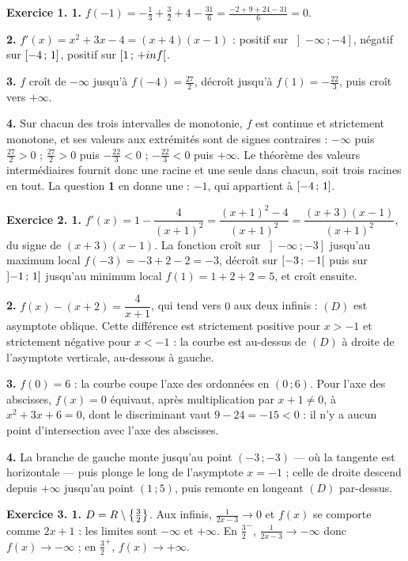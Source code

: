 \begin{corrige}
\textbf{Exercice 1. 1.} $f(-1) = -\frac13+\frac32+4-\frac{31}{6}
= \frac{-2+9+24-31}{6} = 0$.

\textbf{2.} $f'(x) = x^{2}+3x-4 = (x+4)(x-1)$ : positif sur
$\left]-\infty\,;-4\right]$, négatif sur $\left[-4\,;\,1\right]$, positif sur
$\left[1\,;\,+inf\right[$.

\textbf{3.} $f$ croît de $-\infty$ jusqu'à $f(-4) = \frac{27}{2}$, décroît
jusqu'à $f(1) = -\frac{22}{3}$, puis croît vers $+\infty$.

\textbf{4.} Sur chacun des trois intervalles de monotonie, $f$ est continue
et strictement monotone, et ses valeurs aux extrémités sont de signes
contraires : $-\infty$ puis $\frac{27}{2}>0$ ; $\frac{27}{2}>0$ puis
$-\frac{22}{3}<0$ ; $-\frac{22}{3}<0$ puis $+\infty$. Le théorème des valeurs
intermédiaires fournit donc une racine et une seule dans chacun, soit trois
racines en tout. La question \textbf{1} en donne une : $-1$, qui appartient à
$\left[-4\,;\,1\right]$.

\medskip
\textbf{Exercice 2. 1.} $f'(x) = 1-\dfrac{4}{(x+1)^{2}}
= \dfrac{(x+1)^{2}-4}{(x+1)^{2}} = \dfrac{(x+3)(x-1)}{(x+1)^{2}}$, du signe de
$(x+3)(x-1)$. La fonction croît sur $\left]-\infty\,;-3\right]$ jusqu'au
maximum local $f(-3) = -3+2-2 = -3$, décroît sur $\left[-3\,;\,-1\right[$ puis
sur $\left]-1\,;\,1\right]$ jusqu'au minimum local $f(1) = 1+2+2 = 5$, et croît
ensuite.

\textbf{2.} $f(x)-(x+2) = \dfrac{4}{x+1}$, qui tend vers $0$ aux deux
infinis : $(D)$ est asymptote oblique. Cette différence est strictement
positive pour $x>-1$ et strictement négative pour $x<-1$ : la courbe est
au-dessus de $(D)$ à droite de l'asymptote verticale, au-dessous à gauche.

\textbf{3.} $f(0) = 6$ : la courbe coupe l'axe des ordonnées en $(0\,;6)$.
Pour l'axe des abscisses, $f(x) = 0$ équivaut, après multiplication par
$x+1 \neq 0$, à $x^{2}+3x+6 = 0$, dont le discriminant vaut $9-24 = -15<0$ :
il n'y a aucun point d'intersection avec l'axe des abscisses.

\textbf{4.} La branche de gauche monte jusqu'au point $(-3\,;-3)$ — où la
tangente est horizontale — puis plonge le long de l'asymptote $x = -1$ ; celle
de droite descend depuis $+\infty$ jusqu'au point $(1\,;5)$, puis remonte en
longeant $(D)$ par-dessus.

\medskip
\textbf{Exercice 3. 1.} $D = R\setminus\left\{\frac32\right\}$. Aux
infinis, $\frac{1}{2x-3}\to0$ et $f(x)$ se comporte comme $2x+1$ : les limites
sont $-\infty$ et $+\infty$. En $\frac32^{-}$, $\frac{1}{2x-3}\to-\infty$ donc
$f(x)\to-\infty$ ; en $\frac32^{+}$, $f(x)\to+\infty$.


\end{corrige}
